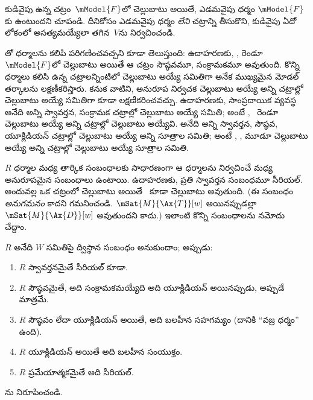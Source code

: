 \documentclass[../../../include/open-logic-section]{subfiles}
\begin{document}
\begin{prob}
 కుడివైపు ఉన్న
 చట్రం~$\mModel{F}$లో
చెల్లుబాటు అయితే, ఎడమవైపు ధర్మం $\mModel{F}$కు
ఉంటుందని చూపండి. దీనికోసం ఎడమవైపు ధర్మం
\emph{లేని} చట్రాన్ని తీసుకొని, కుడివైపు
 ఏదో లోకంలో అసత్యమయ్యేలా
తగిన~$V$ను నిర్వచించండి.
\end{prob}

తో ధర్మాలను కలిపి
పరిగణించవచ్చని కూడా తెలుస్తుంది: ఉదాహరణకు,
,  రెండూ~$\mModel{F}$లో
చెల్లుబాటు అయితే ఆ చట్రం సౌష్ఠవమూ,
సంక్రామకమూ అవుతుంది. కొన్ని ధర్మాలు కలిసి ఉన్న చట్రాలన్నింటిలో చెల్లుబాటు అయ్యే
 సమితిగా అనేక ముఖ్యమైన
మోడల్ తర్కాలను లక్షణీకరిస్తారు. కనుక వాటిని,
అనురూప నిర్వచక 
చెల్లుబాటు అయ్యే అన్ని చట్రాల్లో చెల్లుబాటు అయ్యే
 సమితిగా కూడా లక్షణీకరించవచ్చు.
ఉదాహరణకు, సాంప్రదాయిక వ్యవస్థ  అనేది
అన్ని స్వావర్తన, సంక్రామక చట్రాల్లో చెల్లుబాటు
అయ్యే  సమితి;
అంటే ,~ రెండూ చెల్లుబాటు అయ్యే
అన్ని చట్రాల్లో చెల్లుబాటు అయ్యేవి.
 అనేది అన్ని స్వావర్తన, సౌష్ఠవ,
యూక్లిడియన్ చట్రాల్లో చెల్లుబాటు అయ్యే అన్ని
సూత్రాల సమితి; అంటే , , 
మూడూ చెల్లుబాటు అయ్యే అన్ని చట్రాల్లో
చెల్లుబాటు అయ్యే సూత్రాల సమితి.

$R$ ధర్మాల మధ్య తార్కిక సంబంధాలకు సాధారణంగా
ఆ ధర్మాలను నిర్వచించే 
మధ్య అనురూపమైన సంబంధాలు ఉంటాయి. ఉదాహరణకు,
ప్రతి స్వావర్తన సంబంధమూ సీరియల్. అందువల్ల
ఒక చట్రంలో  చెల్లుబాటు అయితే~
కూడా చెల్లుబాటు అవుతుంది. (ఈ సంబంధం
\emph{అనుగమనం} కాదని గమనించండి.
$\mSat{M}{\Ax{T}}[w]$ అయినప్పుడల్లా
$\mSat{M}{\Ax{D}}[w]$ అవుతుందని కాదు.)
ఇలాంటి కొన్ని సంబంధాలను నమోదు చేద్దాం.

\begin{prop}
  $R$ అనేది $W$ సమితిపై ద్విస్థాన సంబంధం
  అనుకుందాం; అప్పుడు:
  \begin{enumerate}
  \item $R$ స్వావర్తనమైతే సీరియల్ కూడా.
  \item $R$ సౌష్ఠవమైతే, అది సంక్రామకమయ్యేది
    అది యూక్లిడియన్ అయినప్పుడు, అప్పుడే మాత్రమే.
  \item $R$ సౌష్ఠవం లేదా యూక్లిడియన్ అయితే,
    అది బలహీన సహగమ్యం (దానికి ``వజ్ర ధర్మం'' ఉంది).
  \item $R$ యూక్లిడియన్ అయితే అది బలహీన సంయుక్తం.
  \item $R$ ప్రమేయాత్మకమైతే అది సీరియల్.
  \end{enumerate}
\end{prop}

\begin{prob}
  ను నిరూపించండి.
\end{prob}
\end{document}
